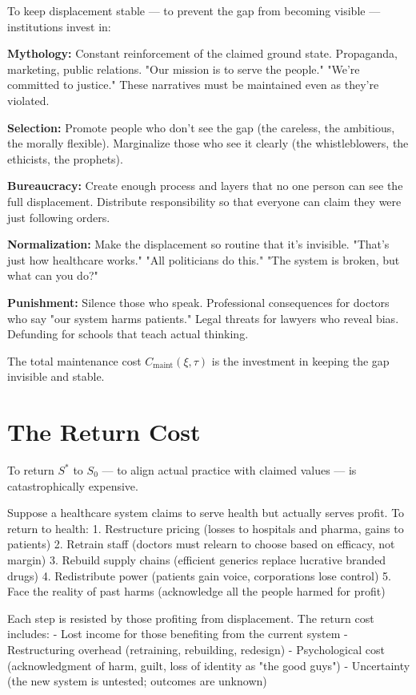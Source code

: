 \documentclass[12pt]{article}
\begin{document}
To keep displacement stable — to prevent the gap from becoming visible — institutions invest in:

\textbf{Mythology:} Constant reinforcement of the claimed ground state. Propaganda, marketing, public relations. "Our mission is to serve the people." "We're committed to justice." These narratives must be maintained even as they're violated.

\textbf{Selection:} Promote people who don't see the gap (the careless, the ambitious, the morally flexible). Marginalize those who see it clearly (the whistleblowers, the ethicists, the prophets).

\textbf{Bureaucracy:} Create enough process and layers that no one person can see the full displacement. Distribute responsibility so that everyone can claim they were just following orders.

\textbf{Normalization:} Make the displacement so routine that it's invisible. "That's just how healthcare works." "All politicians do this." "The system is broken, but what can you do?"

\textbf{Punishment:} Silence those who speak. Professional consequences for doctors who say "our system harms patients." Legal threats for lawyers who reveal bias. Defunding for schools that teach actual thinking.

The total maintenance cost $C_{\text{maint}}(\xi, \tau)$ is the investment in keeping the gap invisible and stable.

\section{The Return Cost}

To return $S^*$ to $S_0$ — to align actual practice with claimed values — is catastrophically expensive.

Suppose a healthcare system claims to serve health but actually serves profit. To return to health:
1. Restructure pricing (losses to hospitals and pharma, gains to patients)
2. Retrain staff (doctors must relearn to choose based on efficacy, not margin)
3. Rebuild supply chains (efficient generics replace lucrative branded drugs)
4. Redistribute power (patients gain voice, corporations lose control)
5. Face the reality of past harms (acknowledge all the people harmed for profit)

Each step is resisted by those profiting from displacement. The return cost includes:
- Lost income for those benefiting from the current system
- Restructuring overhead (retraining, rebuilding, redesign)
- Psychological cost (acknowledgment of harm, guilt, loss of identity as "the good guys")
- Uncertainty (the new system is untested; outcomes are unknown)
\end{document}

